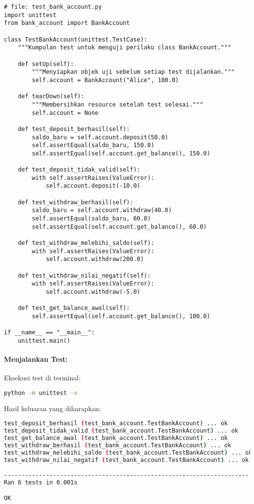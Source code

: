 \begin{lstlisting}[style=PythonStyle, caption={Pengujian method dengan state menggunakan unittest}, label={lst:test-bankaccount}]
# file: test_bank_account.py
import unittest
from bank_account import BankAccount

class TestBankAccount(unittest.TestCase):
    """Kumpulan test untuk menguji perilaku class BankAccount."""

    def setUp(self):
        """Menyiapkan objek uji sebelum setiap test dijalankan."""
        self.account = BankAccount("Alice", 100.0)

    def tearDown(self):
        """Membersihkan resource setelah test selesai."""
        self.account = None

    def test_deposit_berhasil(self):
        saldo_baru = self.account.deposit(50.0)
        self.assertEqual(saldo_baru, 150.0)
        self.assertEqual(self.account.get_balance(), 150.0)

    def test_deposit_tidak_valid(self):
        with self.assertRaises(ValueError):
            self.account.deposit(-10.0)

    def test_withdraw_berhasil(self):
        saldo_baru = self.account.withdraw(40.0)
        self.assertEqual(saldo_baru, 60.0)
        self.assertEqual(self.account.get_balance(), 60.0)

    def test_withdraw_melebihi_saldo(self):
        with self.assertRaises(ValueError):
            self.account.withdraw(200.0)

    def test_withdraw_nilai_negatif(self):
        with self.assertRaises(ValueError):
            self.account.withdraw(-5.0)

    def test_get_balance_awal(self):
        self.assertEqual(self.account.get_balance(), 100.0)

if __name__ == "__main__":
    unittest.main()
\end{lstlisting}

\paragraph{Menjalankan Test:}
Eksekusi test di terminal:

\begin{lstlisting}[language=bash]
python -m unittest -v
\end{lstlisting}

Hasil keluaran yang diharapkan:

\begin{lstlisting}[language=bash]
test_deposit_berhasil (test_bank_account.TestBankAccount) ... ok
test_deposit_tidak_valid (test_bank_account.TestBankAccount) ... ok
test_get_balance_awal (test_bank_account.TestBankAccount) ... ok
test_withdraw_berhasil (test_bank_account.TestBankAccount) ... ok
test_withdraw_melebihi_saldo (test_bank_account.TestBankAccount) ... ok
test_withdraw_nilai_negatif (test_bank_account.TestBankAccount) ... ok

----------------------------------------------------------------------
Ran 6 tests in 0.001s

OK
\end{lstlisting}

